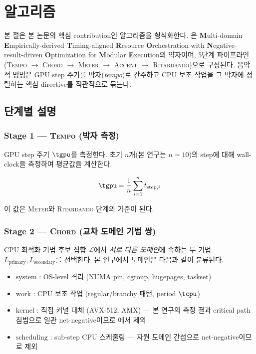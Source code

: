 
\section{\algname 알고리즘}
\label{sec:metronome}

본 절은 본 논문의 핵심 contribution인 \algname 알고리즘을 형식화한다.
\algname 은 \textbf{M}ulti-domain \textbf{E}mpirically-derived \textbf{T}iming-aligned \textbf{R}esource \textbf{O}rchestration with \textbf{N}egative-result-driven \textbf{O}ptimization for \textbf{M}odular \textbf{E}xecution의 약자이며, 5단계 파이프라인(\textsc{Tempo} $\rightarrow$ \textsc{Chord} $\rightarrow$ \textsc{Meter} $\rightarrow$ \textsc{Accent} $\rightarrow$ \textsc{Ritardando})으로 구성된다.
음악적 명명은 GPU step 주기를 박자(\emph{tempo})로 간주하고 CPU 보조 작업을 그 박자에 정렬하는 핵심 directive를 직관적으로 묶는다.



\subsection{단계별 설명}
\label{subsec:stages}

\subsubsection{Stage 1 --- \textsc{Tempo} (박자 측정)}

GPU step 주기 $\tgpu$를 측정한다.
초기 $n$개(본 연구는 $n=10$)의 step에 대해 wall-clock을 측정하여 평균값을 계산한다.

\begin{equation}
\tgpu = \frac{1}{n} \sum_{i=1}^{n} t_{\text{step},i}
\end{equation}

이 값은 \textsc{Meter}와 \textsc{Ritardando} 단계의 기준이 된다.

\subsubsection{Stage 2 --- \textsc{Chord} (교차 도메인 기법 쌍)}

CPU 최적화 기법 후보 집합 $\mathcal{L}$에서 \emph{서로 다른 도메인}에 속하는 두 기법 $L_{\text{primary}}, L_{\text{secondary}}$를 선택한다.
본 연구에서 도메인은 다음과 같이 분류된다.

\begin{itemize}
  \item $\mathrm{system}$ : OS-level 격리 (NUMA pin, cgroup, hugepages, taskset)
  \item $\mathrm{work}$ : CPU 보조 작업 (regular/branchy 패턴, period $\tcpu$)
  \item $\mathrm{kernel}$ : 직접 커널 대체 (AVX-512, AMX) --- 본 연구의 측정 결과 critical path 침범으로 일관 net-negative이므로 \algname 에서 제외
  \item $\mathrm{scheduling}$ : sub-step CPU 스케줄링 --- 자원 도메인 간섭으로 net-negative이므로 제외
\end{itemize}

